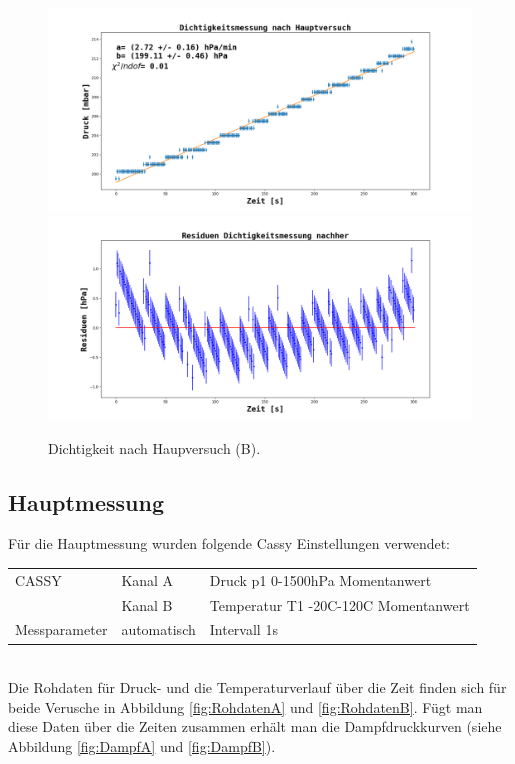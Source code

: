 \documentclass[12pt,a4paper]{article}
\begin{document}
\begin{figure}
\centering
\includegraphics[width=\linewidth]{Bilder/Dichtigkeit_nachher_B.png}
\includegraphics[width=\linewidth]{Bilder/Residuen_Dichtigkeit_nachher_B}
\caption[Dichtigkeit B nachher]{Dichtigkeit nach Haupversuch (B).}
\label{fig:DichtigkeitNachherB}
\end{figure}



\subsection{Hauptmessung}

Für die Hauptmessung wurden folgende Cassy Einstellungen verwendet:\\

\begin{tabular}{l l l}
CASSY & Kanal A & Druck p1 0-1500hPa Momentanwert\\
& Kanal B & Temperatur T1 -20C-120C Momentanwert\\
Messparameter & automatisch & Intervall 1s
\end{tabular}\\

Die Rohdaten für Druck- und die Temperaturverlauf über die Zeit finden sich für beide Verusche in Abbildung \ref{fig:RohdatenA} und \ref{fig:RohdatenB}. Fügt man diese Daten über die Zeiten zusammen erhält man die Dampfdruckkurven (siehe Abbildung \ref{fig:DampfA} und \ref{fig:DampfB}).\\
\end{document}
